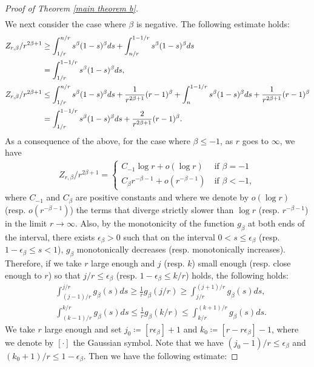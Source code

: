 \documentclass[12pt]{article}
\theoremstyle{definition}
\begin{document}
\begin{proof}[Proof of Theorem \ref{main theorem b}]
\begin{align*}
\end{align*}
We next consider the case where $\beta$ is negative. The following estimate holds:
\begin{align}
Z_{r,\beta} /r^{2\beta+1}
&\geq \int_{1/r}^{n/r}s^\beta(1-s)^\beta ds+\int_{n/r}^{1-1/r}s^\beta(1-s)^\beta ds \notag \\
&=\int_{1/r}^{1-1/r}s^\beta(1-s)^\beta ds, \label{1-s}\\
Z_{r,\beta}/r^{2\beta+1}&\leq \int_{1/r}^{n/r}s^\beta (1-s)^\beta ds +\frac{1}{r^{2\beta+1}}(r-1)^\beta+\int_n^{1-1/r}s^\beta (1-s)^\beta ds+\frac{1}{r^{2\beta+1}}(r-1)^\beta \notag\\
&=\int_{1/r}^{1-1/r}s^\beta (1-s)^\beta ds+\frac{2}{r^{2\beta+1}}(r-1)^\beta \label{int}. 
\end{align}
As a consequence of the above, for the case where $\beta\leq -1$, as $r$ goes to $\infty$, we have
\begin{align*}
Z_{r,\beta} /r^{2\beta+1}=\begin{cases}
C_{-1}\log r+o(\log r) \ &\text{if $\beta=-1$}\\
C_\beta r^{-\beta-1}+o(r^{-\beta-1}) \ &\text{if $\beta< -1$},
\end{cases}
\end{align*}
where $C_{-1}$ and $C_\beta$ are positive constants and where we denote by $o(\log r)$ (resp. $o(r^{-\beta-1})$) the terms that diverge strictly slower than $\log r$ (resp. $r^{-\beta-1}$) in the limit $r\to\infty$.
Also, by the monotonicity of the function $g_\beta$ at both ends of the interval, there exists $\epsilon_\beta>0$ such that on the interval $0<s\leq \epsilon_\beta$ (resp. $1-\epsilon_\beta\leq s<1$), $g_\beta$ monotonically decreases (resp. monotonically increases). Therefore, if we take $r$ large enough and $j$ (resp. $k$) small enough (resp. close enough to $r$) so that $j/r\leq \epsilon_\beta$ (resp. $1-\epsilon_\beta\leq k/r$) holds, the following holds:
\begin{align}
&\int_{(j-1)/r}^{j/r}g_\beta(s)ds\geq \frac{1}{r}g_\beta(j/r)\geq \int_{j/r}^{(j+1)/r}g_\beta(s)ds, \label{jr}\\ 
&\int_{(k-1)/r}^{k/r}g_\beta(s)ds\leq \frac{1}{r}g_\beta(k/r)\leq \int_{k/r}^{(k+1)/r}g_\beta(s)ds. \label{kr}
\end{align}
We take $r$ large enough and set $j_0\coloneqq [r\epsilon_\beta ]+1$ and $k_0\coloneqq [r-r\epsilon_\beta]-1$, where we denote by $[\cdot]$ the Gaussian symbol. Note that we have $(j_0-1)/r\leq \epsilon_\beta$ and $(k_0+1)/r\leq 1-\epsilon_\beta$. Then we have the following estimate:

\end{proof}
\end{document}
